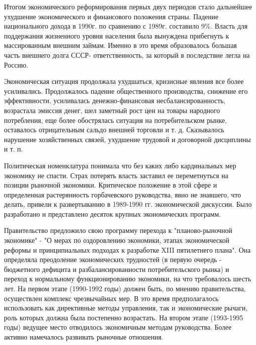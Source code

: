 \documentclass{article}
\begin{document}
\hfill

Итогом экономического реформирования первых двух периодов стало дальнейшее ухудшение экономического и финансового положения страны. Падение национального дохода в 1990г. по сравнению с 1989г. составило 9\%. Власть для поддержания жизненного уровня населения была вынуждена прибегнуть к массированным внешним займам. Именно в это время образовалось большая часть внешнего долга СССР- ответственность, за который в последствие легла на Россию.

\hfill

Экономическая ситуация продолжала ухудшаться, кризисные явления все более усиливались. Продолжалось падение общественного производства, снижение его эффективности, усиливалась денежно-финансовая несбалансированность, возрастала эмиссия денег, шел заметный рост цен на товары народного потребления, еще более обострялась ситуация на потребительском рынке, оставалось отрицательным сальдо внешней торговли и т. д. Сказывалось нарушение хозяйственных связей, ухудшение трудовой и договорной дисциплины и т. п.

\hfill

Политическая номенклатура понимала что без каких либо кардинальных мер экономику не спасти. Страх потерять власть заставил ее переметнуться на позиции рыночной экономики. Критическое положение в этой сфере и определенная растерянность горбачевского руководства, явно не знавшего, что делать, привели к развертыванию в 1989-1990 гг. экономической дискуссии. Было разработано и представлено десяток крупных экономических программ.

\hfill

Правительство предложило свою программу перехода к "планово-рыночной экономике" - "О мерах по оздоровлению экономики, этапах экономической реформы и принципиальных подходах к разработке XIII пятилетнего плана". Она определяла преодоление экономических трудностей (в первую очередь - бюджетного дефицита и разбалансированности потребительского рынка) и переход к нормальному функционированию экономики, на что требовалось шесть лет. На первом этапе (1990-1992 годы) должен быть, по мнению правительства, осуществлен комплекс чрезвычайных мер. В это время предполагалось использовать как директивные методы управления, так и экономические рычаги, роль которых должна была постепенно возрастать. На втором этапе (1993-1995 годы) ведущее место отводилось экономичным методам руководства. Более активно намечалось развивать рыночные отношения.

\hfill
\end{document}
